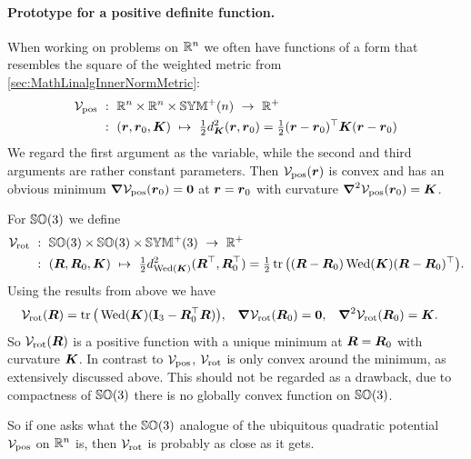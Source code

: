 \paragraph{Prototype for a positive definite function.}
When working on problems on $\RealNum^\dimConfigSpace$ we often have functions of a form that resembles the square of the weighted metric from \autoref{sec:MathLinalgInnerNormMetric}:
\begin{align}
 \potentialEnergy_{\text{pos}} \ &: \ \RealNum^\dimConfigSpace \times \RealNum^\dimConfigSpace \times \SymMatP(\dimConfigSpace) \ \rightarrow \ \RealNum^+ 
\nonumber\\
 &: \ (\r,\r_0, \mat{K}) \ \mapsto \ \tfrac{1}{2} \metricSq[\mat{K}]{\r}{\r_0} 
 = \tfrac{1}{2} (\r-\r_0)^\top \mat{K}(\r-\r_0) 
\end{align}
We regard the first argument as the variable, while the second and third arguments are rather constant parameters.
Then $\potentialEnergy_{\text{pos}}(\r)$ is convex and has an obvious minimum $\differential\potentialEnergy_{\text{pos}}(\r_0) = \tuple{0}$ at $\r=\r_0$ with curvature $\differential^2\potentialEnergy_{\text{pos}}(\r_0) = \mat{K}$.

For $\SpecialOrthogonalGroup(3)$ we define
\begin{align}
 \potentialEnergy_{\text{rot}} \ &: \ \SpecialOrthogonalGroup(3) \times \SpecialOrthogonalGroup(3) \times \SymMatP(3) \ \rightarrow \ \RealNum^+ 
\\
 &: \ (\R,\R_0, \mat{K}) \ \mapsto \ \tfrac{1}{2} \metricSq[\wedMatOp(\mat{K})]{\R^\top}{\R_0^\top} 
 = \tfrac{1}{2} \tr\big( (\R-\R_0) \wedMatOp(\mat{K}) (\R-\R_0)^\top \big) 
.
\nonumber
\end{align}
Using the results from above we have
\begin{align}
 \potentialEnergy_{\text{rot}}(\R) &= \tr\big( \wedMatOp(\mat{K})(\idMat[3] - \R_0^\top\R ) \big),&
 \differential \potentialEnergy_{\text{rot}}(\R_0) &= \tuple{0},&
 \differential^2 \potentialEnergy_{\text{rot}}(\R_0) &= \mat{K}. 
\end{align}
So $\potentialEnergy_{\text{rot}}(\R)$ is a positive function with a unique minimum at $\R=\R_0$ with curvature $\mat{K}$.
In contrast to $\potentialEnergy_{\text{pos}}$, $\potentialEnergy_{\text{rot}}$ is only convex around the minimum, as extensively discussed above.
This should not be regarded as a drawback, due to compactness of $\SpecialOrthogonalGroup(3)$ there is no globally convex function on $\SpecialOrthogonalGroup(3)$.

So if one asks what the $\SpecialOrthogonalGroup(3)$ analogue of the ubiquitous quadratic potential $\potentialEnergy_{\text{pos}}$ on $\RealNum^\dimConfigSpace$ is, then $\potentialEnergy_{\text{rot}}$ is probably as close as it gets.

